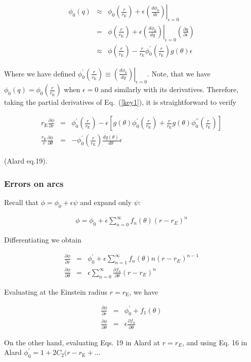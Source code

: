 \documentclass{article}
\def\bea{\begin{eqnarray}}
\def\eea{\end{eqnarray}}
\newcommand{\eps}{\epsilon}
\def \eps {\epsilon}
\def \te {\theta}
\def \rre {\frac{r}{r_{\mathrm{E}}}}
\def \pa {\partial}
\def \prre {\left( \rre\right)}
\def \te {\theta}
\def \pa {\partial}
\begin{document}
\def\dpdq{ \left. \left( \frac{d\phi_0}{dq}\right) \right|_{\eps=0} }
\def\dpde{ \left. \left( \frac{d\phi_0}{d\eps}\right) \right|_{\eps=0} }

\begin{eqnarray}
 \phi_0(q) &\approx& \phi_0\prre+\eps \dpde \\
	  & = & \phi\prre+\eps \dpdq  \left(\frac{\pa q}{\pa \eps}\right)\\
	  &\approx& \phi\prre-\rre\phi_0^\prime\prre g(\te)\eps \label{key1}
\end{eqnarray}

Where we have defined $\phi_0^\prime\prre \equiv  \dpdq$.  Note, that we have $\phi_0(q)=\phi_0\prre$ when $\eps=0$ and similarly with its derivatives. Therefore,
taking the partial derivatives of Eq.~(\ref{key1}), it is straightforward to verify

\begin{eqnarray}
 r_{\mathrm{E}}\frac{\pa \phi}{\pa r}&=& \phi_0^\prime\prre -%
  \eps\left[g(\te)\phi_0^\prime\prre+\rre g(\te)\phi_0^{\prime \prime}\prre\right]\\
\frac{r_{\mathrm{E}}}{r}\frac{\pa \phi}{\pa \te}&=&-\phi_0^\prime\prre \frac{dg(\te)}{d\te}\eps
\end{eqnarray}

(Alard eq.19).


\subsubsection{Errors on arcs}

Recall that $\phi=\phi_0+\eps\psi$ and expand only $\psi$:

\bea
\phi=\phi_0+\eps\sum_{n=0}^{\infty}f_n(\theta)(r-r_E)^n
\eea

Differentiating we obtain

\bea
\frac{\partial \phi}{\partial r }&=&\phi_0^\prime+\eps\sum_{n=1}^{\infty}f_n(\theta)n(r-r_E)^{n-1} \\
\frac{\partial \phi}{\partial \theta}&=&\eps\sum_{n=0}^{\infty} \frac{\partial f_n}{\partial \theta}(r-r_E)^n
\eea

Evaluating at the Einstein radius $r=r_{\mathrm{E}}$, we have

\bea
\frac{\partial \phi}{\partial r }&=&\phi_0^\prime+f_1(\theta) \\
\frac{\partial \phi}{\partial \theta}&=&\eps \frac{\partial f_0}{\partial \theta}
\eea

On the other hand, evaluating Eqs. 19 in Alard at $r=r_E$, and using Eq. 16 in Alard $\phi_0^\prime=1+2C_2(r-r_{\mathrm{E}}+...$ 
\end{document}

